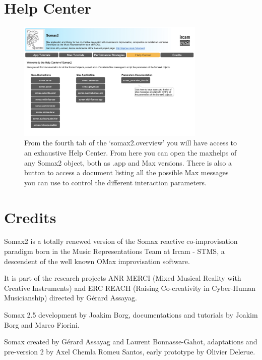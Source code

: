 \section{Help Center}

\begin{figure}[H]
    \centering        
 	\includegraphics[width=0.8\textwidth]{img/help_center.png}
    \caption{From the fourth tab of the `somax2.overview' you will have access to an exhaustive Help Center. From here you can open the maxhelps of any Somax2 object, both as .app and Max versions. There is also a button to access a document listing all the possible Max messages you can use to control the different interaction parameters.}
    \label{fig:help_center}
\end{figure}

\section{Credits}

Somax2 is a totally renewed version of the Somax reactive co-improvisation paradigm born in the Music Representations Team at Ircam - STMS, a descendent of the well known OMax improvisation software.

It is  part of the research projects ANR MERCI (Mixed Musical Reality with Creative Instruments) and ERC REACH (Raising Co-creativity in Cyber-Human Musicianship) directed by Gérard Assayag.

\vspace{5mm}

\noindent Somax 2.5  development by Joakim Borg, documentations and tutorials by Joakim Borg and Marco Fiorini.

Somax  created  by Gérard Assayag and Laurent Bonnasse-Gahot, adaptations and pre-version 2 by Axel Chemla Romeu Santos, early prototype by Olivier Delerue.


